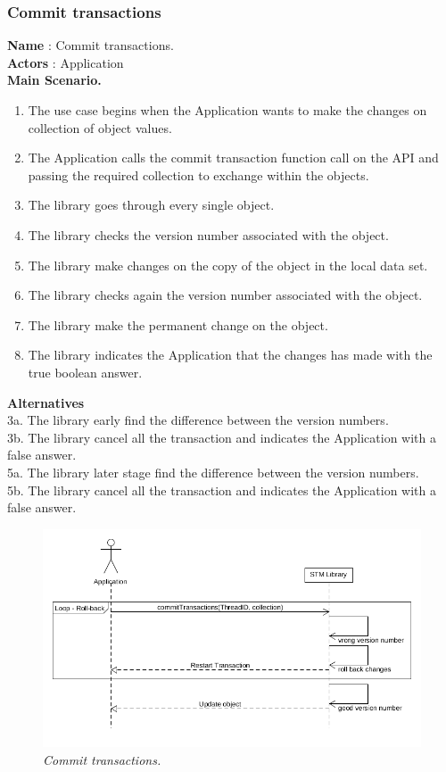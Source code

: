 \documentclass[12pt]{article}
\begin{document}
{\subsubsection{Commit transactions}
\textbf{Name} : Commit transactions.\\
\textbf{Actors} : Application\\
\textbf{Main Scenario.}
\begin{enumerate}
  \item The use case begins when the Application wants to make the changes on collection of object values.
  \item The Application calls the commit transaction function call on the API and passing the required collection to exchange within the objects.
  \item The library goes through every single object.
  \item The library checks the version number associated with the object.
  \item The library make changes on the copy of the object in the local data set.
  \item The library checks again the version number associated with the object. 
  \item The library make the permanent change on the object.
  \item The library indicates the Application that the changes has made with the true boolean answer.
\end{enumerate}
\textbf{Alternatives}\\
3a. The library early find the difference between the version numbers.\\
3b. The library cancel all the transaction and indicates the Application with a false answer.\\
5a. The library later stage find the difference between the version numbers.\\
5b. The library cancel all the transaction and indicates the Application with a false answer.\\

\begin{figure}[h!]
\centering
\includegraphics[scale=0.3]{Pictures/commitTransactions.png}
\caption{\textit{\color{gray}Commit transactions.}}
\end{figure}

}
\end{document}
